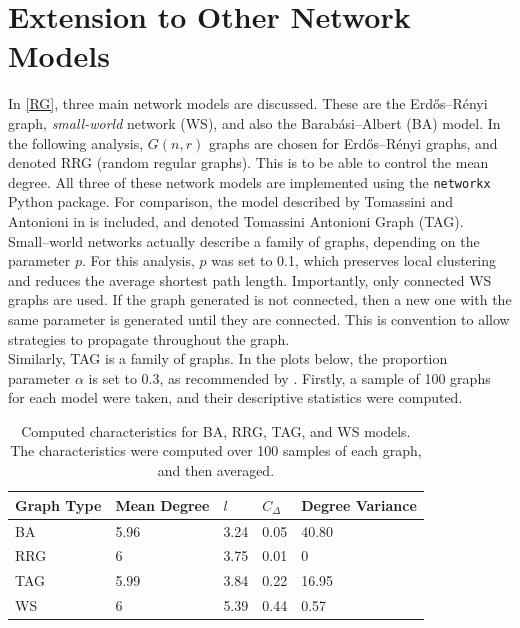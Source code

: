 \section{Extension to Other Network Models}

In \ref{RG}, three main network models are discussed. These are the Erd\H{o}s--R\'enyi graph, \emph{small-world} network (WS), and also the Barab\'{a}si--Albert (BA) model. In the following analysis, $G(n,r)$ graphs are chosen for Erd\H{o}s--R\'enyi graphs, and denoted RRG (random regular graphs). This is to be able to control the mean degree. All three of these network models are implemented using the \verb+networkx+ Python package. For comparison, the model described by Tomassini and Antonioni in \cite{RN51} is included, and denoted Tomassini Antonioni Graph (TAG). \\

Small--world networks actually describe a family of graphs, depending on the parameter $p$. For this analysis, $p$ was set to 0.1, which preserves local clustering and reduces the average shortest path length. Importantly, only connected WS graphs are used. If the graph generated is not connected, then a new one with the same parameter is generated until they are connected. This is convention to allow strategies to propagate throughout the graph. \\

Similarly, TAG is a family of graphs. In the plots below, the proportion parameter $\alpha$ is set to 0.3, as recommended by \cite{RN49}. Firstly, a sample of 100 graphs for each model were taken, and their descriptive statistics were computed. \\


\FloatBarrier

    

\begin{table}[!h]
\begin{center}
\begin{tabular}{|l|l|l|l|l|}
\hline
Graph Type & Mean Degree & $l$ & $C_\Delta$ & Degree Variance \\ \hline
BA         & 5.96        & 3.24                         & 0.05                   & 40.80           \\ \hline
RRG        & 6           & 3.75                         & 0.01                   & 0               \\ \hline
TAG        & 5.99        & 3.84                         & 0.22                   & 16.95           \\ \hline
WS         & 6           & 5.39                         & 0.44                   & 0.57            \\ \hline
\end{tabular}
\caption{Computed characteristics for BA, RRG, TAG, and WS models. The characteristics were computed over 100 samples of each graph, and then averaged. } \label{graph_stats}
\end{center}
\end{table}

